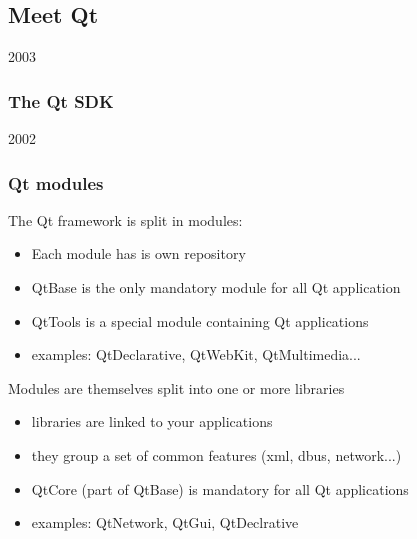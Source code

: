 %
%
%
%

\subsection{Meet Qt}

\begin{slide}{2003}\frametitle{The Qt SDK}
\vspace*{0.5em}

\end{slide}

\begin{slide}{2002}\frametitle{Qt modules}
\vspace*{1.5em}
The Qt framework is split in modules:
\begin{itemize}
\item Each module has is own repository
\item QtBase is the only mandatory module for all Qt application
\item QtTools is a special module containing Qt applications
\item examples: QtDeclarative, QtWebKit, QtMultimedia...
\end{itemize}\medskip
Modules are themselves split into one or more libraries
\begin{itemize}
\item libraries are linked to your applications
\item they group a set of common features (xml, dbus, network...)
\item QtCore (part of QtBase) is mandatory for all Qt applications
\item examples: QtNetwork, QtGui, QtDeclrative
\end{itemize}

\end{slide}

